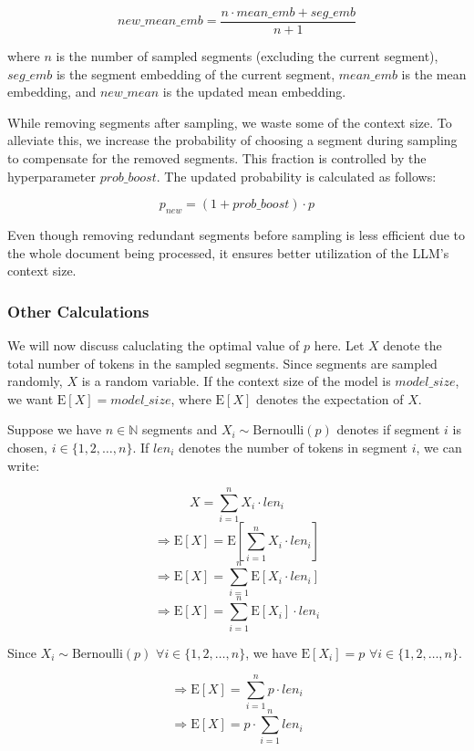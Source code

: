 			\[ new\_mean\_emb = \frac{n \cdot mean\_emb + seg\_emb}{n + 1} \]

			where $n$ is the number of sampled segments (excluding the current segment), $seg\_emb$ is the
			segment embedding of the current segment, $mean\_emb$ is the mean embedding, and $new\_mean$ is
			the updated mean embedding.

			While removing segments after sampling, we waste some of the context size.
			To alleviate this, we increase the probability of choosing a segment during sampling to
			compensate for the removed segments.
			This fraction is controlled by the hyperparameter $prob\_boost$.
			The updated probability is calculated as follows:
			
			\[ p_{new} = (1 + prob\_boost) \cdot p \]

			Even though removing redundant segments before sampling is less efficient due to the whole
			document being processed, it ensures better utilization of the LLM's context size.

		\subsubsection*{Other Calculations}
		
			We will now discuss caluclating the optimal value of $p$ here.
			Let $X$ denote the total number of tokens in the sampled segments.
			Since segments are sampled randomly, $X$ is a random variable.
			If the context size of the model is $model\_size$, we want $\mathrm{E}[X] = model\_size$,
			where $\mathrm{E}[X]$ denotes the expectation of $X$.

			Suppose we have $n \in \mathbb{N}$ segments and $X_i \sim \mathrm{Bernoulli}(p)$ denotes
			if segment $i$ is chosen, $i \in \{1, 2, \dots, n\}$.
			If $len_i$ denotes the number of tokens in segment $i$, we can write:

			\[ X = \sum_{i = 1}^{n} X_i \cdot len_i \]
			\[ \Rightarrow \mathrm{E}[X] = \mathrm{E}[\sum_{i = 1}^{n} X_i \cdot len_i] \]
			\[ \Rightarrow \mathrm{E}[X] = \sum_{i = 1}^{n} \mathrm{E}[X_i \cdot len_i] \]
			\[ \Rightarrow \mathrm{E}[X] = \sum_{i = 1}^{n} \mathrm{E}[X_i] \cdot len_i \]

			Since $X_i \sim \mathrm{Bernoulli}(p)$ $\forall i \in \{1, 2, \dots, n\}$, we
			have $\mathrm{E}[X_i] = p$ $\forall i \in \{1, 2, \dots, n\}$.

			\[ \Rightarrow \mathrm{E}[X] = \sum_{i = 1}^{n} p \cdot len_i \]
			\[ \Rightarrow \mathrm{E}[X] = p \cdot \sum_{i = 1}^{n} len_i \]

